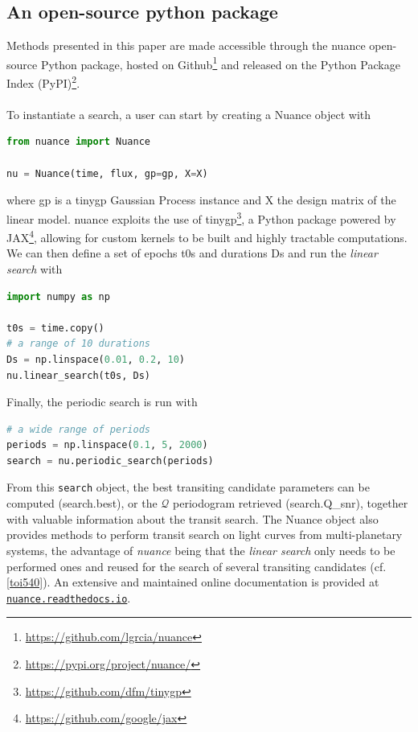 \documentclass[modern]{aastex631}
\newcommand{\nuancemethod}{\textit{nuance}}
\newcommand{\nuancecode}{\textsf{nuance}}
\newcommand{\footlink}[1]{\footnote{\url{#1}}}
\begin{document}
\subsection{An open-source python package}
Methods presented in this paper are made accessible through the \nuancecode{} open-source Python package, hosted on Github\footnote{\href{https://github.com/lgrcia/nuance}{https://github.com/lgrcia/nuance}} and released on the Python Package Index (PyPI)\footlink{https://pypi.org/project/nuance/}. 
\\\\
To instantiate a search, a user can start by creating a \textsf{Nuance} object with
\begin{lstlisting}[language=Python]
from nuance import Nuance

nu = Nuance(time, flux, gp=gp, X=X)
\end{lstlisting}
where \textsf{gp} is a \textsf{tinygp} Gaussian Process instance and \textsf{X} the design matrix of the linear model. \textsf{nuance} exploits the use of \textsf{tinygp}\footnote{\href{https://github.com/dfm/tinygp}{https://github.com/dfm/tinygp}}, a Python package powered by \textsf{JAX}\footnote{\href{https://github.com/google/jax}{https://github.com/google/jax}}, allowing for custom kernels to be built and highly tractable computations. We can then define a set of epochs \textsf{t0s} and durations \textsf{Ds} and run the \textit{linear search} with
\begin{lstlisting}[language=Python,linewidth=\linewidth]
import numpy as np

t0s = time.copy()
# a range of 10 durations
Ds = np.linspace(0.01, 0.2, 10)
nu.linear_search(t0s, Ds)
\end{lstlisting}
Finally, the periodic search is run with
\begin{lstlisting}[language=Python]
# a wide range of periods
periods = np.linspace(0.1, 5, 2000)
search = nu.periodic_search(periods)
\end{lstlisting}
From this \texttt{search} object, the best transiting candidate parameters can be computed (\textsf{search.best}), or the $\mathcal{Q}$ periodogram retrieved (\textsf{search.Q\_snr}), together with valuable information about the transit search. The \textsf{Nuance} object also provides methods to perform transit search on light curves from multi-planetary systems, the advantage of \nuancemethod{} being that the \textit{linear search} only needs to be performed ones and reused for the search of several transiting candidates (cf.\;\autoref{toi540}). An extensive and maintained online documentation is provided at \href{https://nuance.readthedocs.io}{\texttt{nuance.readthedocs.io}}.
\end{document}
